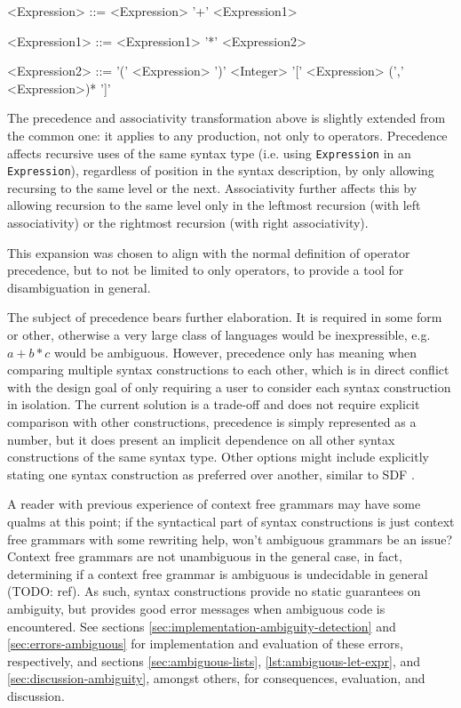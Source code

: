 \documentclass{kththesis}
\begin{document}
\setlength{\grammarindent}{8em}
\begin{grammar}
<Expression> ::= <Expression> '+' <Expression1>

<Expression1> ::= <Expression1> '*' <Expression2>

<Expression2> ::= '(' <Expression> ')'
  \alt <Integer>
  \alt '[' <Expression> (',' <Expression>)* ']'
\end{grammar}

The precedence and associativity transformation above is slightly extended from the common one: it applies to any production, not only to operators. Precedence affects recursive uses of the same syntax type (i.e. using \texttt{Expression} in an \texttt{Expression}), regardless of position in the syntax description, by only allowing recursing to the same level or the next. Associativity further affects this by allowing recursion to the same level only in the leftmost recursion (with left associativity) or the rightmost recursion (with right associativity).

This expansion was chosen to align with the normal definition of operator precedence, but to not be limited to only operators, to provide a tool for disambiguation in general.

The subject of precedence bears further elaboration. It is required in some form or other, otherwise a very large class of languages would be inexpressible, e.g. $a + b * c$ would be ambiguous. However, precedence only has meaning when comparing multiple syntax constructions to each other, which is in direct conflict with the design goal of only requiring a user to consider each syntax construction in isolation. The current solution is a trade-off and does not require explicit comparison with other constructions, precedence is simply represented as a number, but it does present an implicit dependence on all other syntax constructions of the same syntax type. Other options might include explicitly stating one syntax construction as preferred over another, similar to SDF \cite{Heering1989The-syntax-defi}.

A reader with previous experience of context free grammars may have some qualms at this point; if the syntactical part of syntax constructions is just context free grammars with some rewriting help, won't ambiguous grammars be an issue? Context free grammars are not unambiguous in the general case, in fact, determining if a context free grammar is ambiguous is undecidable in general (TODO: ref). As such, syntax constructions provide no static guarantees on ambiguity, but provides good error messages when ambiguous code is encountered. See sections \ref{sec:implementation-ambiguity-detection} and \ref{sec:errors-ambiguous} for implementation and evaluation of these errors, respectively, and sections \ref{sec:ambiguous-lists}, \ref{lst:ambiguous-let-expr}, and \ref{sec:discussion-ambiguity}, amongst others, for consequences, evaluation, and discussion.
\end{document}
